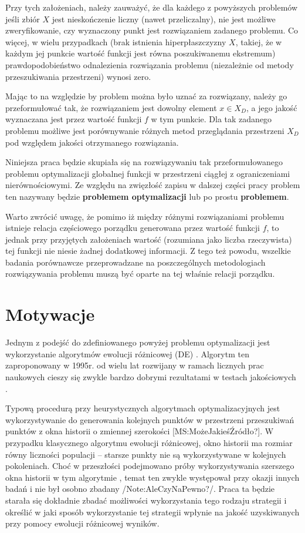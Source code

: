 \documentclass[12pt,a4paper]{report}
\begin{document}
{\par{
Przy tych założeniach, należy zauważyć, że dla każdego z powyższych problemów jeśli zbiór $X$ jest nieskończenie liczny (nawet przeliczalny), nie jest możliwe zweryfikowanie, czy wyznaczony punkt jest rozwiązaniem zadanego problemu. Co więcej, w wielu przypadkach (brak istnienia hiperpłaszczyzny $X$, takiej, że w każdym jej punkcie wartość funkcji jest równa poszukiwanemu ekstremum) prawdopodobieństwo odnalezienia rozwiązania problemu (niezależnie od metody przeszukiwania przestrzeni) wynosi zero.
}
\par{
Mając to na względzie by problem można było uznać za rozwiązany, należy go przeformułować tak, że rozwiązaniem jest dowolny element $x \in X_D$, a jego jakość wyznaczana jest przez wartość funkcji $f$ w tym punkcie. Dla tak zadanego problemu możliwe jest porównywanie różnych metod przeglądania przestrzeni $X_D$ pod względem jakości otrzymanego rozwiązania.
}
\par{
Niniejsza praca będzie skupiała się na rozwiązywaniu tak przeformułowanego problemu optymalizacji globalnej funkcji w przestrzeni ciągłej z ograniczeniami nierównościowymi. Ze względu na zwięzłość zapisu w dalszej części pracy problem ten nazywany będzie \textbf{problemem optymalizacji} lub po prostu \textbf{problemem}. 
}
\par{
Warto zwrócić uwagę, że pomimo iż między różnymi rozwiązaniami problemu istnieje relacja częściowego porządku generowana przez wartość funkcji $f$, to jednak przy przyjętych założeniach wartość (rozumiana jako liczba rzeczywista) tej funkcji nie niesie żadnej dodatkowej informacji. Z tego też powodu, wszelkie badania porównawcze przeprowadzane na poszczególnych metodologiach rozwiązywania problemu muszą być oparte na tej właśnie relacji porządku.
}

\section{Motywacje}
\par{
Jednym z podejść do zdefiniowanego powyżej problemu optymalizacji jest wykorzystanie algorytmów ewolucji różnicowej (DE) \cite{RainerStorn}. Algorytm ten zaproponowany w 1995r. od wielu lat rozwijany w ramach licznych prac naukowych \cite{Opara,SpringerIntroToEvol} cieszy się zwykle bardzo dobrymi rezultatami w testach jakościowych \cite{CEC2013Comp}. 
}
\par{
Typową procedurą przy heurystycznych algorytmach optymalizacyjnych jest wykorzystywanie do generowania kolejnych punktów w przestrzeni przeszukiwań punktów z okna historii o zmiennej szerokości [MS:MożeJakieśŹródło?]. W przypadku klasycznego algorytmu ewolucji różnicowej, okno historii ma rozmiar równy liczności populacji -- starsze punkty nie są wykorzystywane w kolejnych pokoleniach. Choć w przeszłości podejmowano próby wykorzystywania szerszego okna historii w tym algorytmie \cite{JADE,SHADE}, temat ten zwykle występował przy okazji innych badań i nie był osobno zbadany /Note:AleCzyNaPewno?/. Praca ta będzie starała się dokładnie zbadać możliwości wykorzystania tego rodzaju strategii i określić w jaki sposób wykorzystanie tej strategii wpłynie na jakość uzyskiwanych przy pomocy ewolucji różnicowej wyników.
}

}
\end{document}
